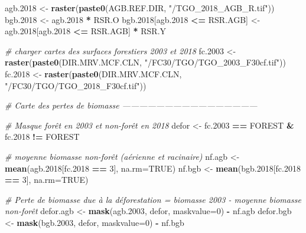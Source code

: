 \documentclass[a4paper, notitlepage, 12pt, krantz2]{krantz}
\newenvironment{Shaded}{\begin{snugshade}}{\end{snugshade}}
\newcommand{\CommentTok}[1]{\textcolor[rgb]{0.56,0.35,0.01}{\textit{#1}}}
\newcommand{\DataTypeTok}[1]{\textcolor[rgb]{0.13,0.29,0.53}{#1}}
\newcommand{\DecValTok}[1]{\textcolor[rgb]{0.00,0.00,0.81}{#1}}
\newcommand{\FloatTok}[1]{\textcolor[rgb]{0.00,0.00,0.81}{#1}}
\newcommand{\KeywordTok}[1]{\textcolor[rgb]{0.13,0.29,0.53}{\textbf{#1}}}
\newcommand{\NormalTok}[1]{#1}
\newcommand{\OperatorTok}[1]{\textcolor[rgb]{0.81,0.36,0.00}{\textbf{#1}}}
\newcommand{\OtherTok}[1]{\textcolor[rgb]{0.56,0.35,0.01}{#1}}
\newcommand{\StringTok}[1]{\textcolor[rgb]{0.31,0.60,0.02}{#1}}
\begin{document}
\begin{Shaded}
\begin{Highlighting}[]
{\NormalTok{agb}\FloatTok{.2018}\NormalTok{ <-}\StringTok{ }\KeywordTok{raster}\NormalTok{(}\KeywordTok{paste0}\NormalTok{(AGB.REF.DIR, }\StringTok{"/TGO_2018_AGB_R.tif"}\NormalTok{))}
\NormalTok{bgb}\FloatTok{.2018}\NormalTok{ <-}\StringTok{ }\NormalTok{agb}\FloatTok{.2018} \OperatorTok{*}\StringTok{ }\NormalTok{RSR.O}
\NormalTok{bgb}\FloatTok{.2018}\NormalTok{[agb}\FloatTok{.2018} \OperatorTok{<=}\StringTok{ }\NormalTok{RSR.AGB] <-}\StringTok{ }\NormalTok{agb}\FloatTok{.2018}\NormalTok{[agb}\FloatTok{.2018} \OperatorTok{<=}\StringTok{ }\NormalTok{RSR.AGB] }\OperatorTok{*}\StringTok{ }\NormalTok{RSR.Y}

\CommentTok{# charger cartes des surfaces forestiers 2003 et 2018}
\NormalTok{fc}\FloatTok{.2003}\NormalTok{ <-}\StringTok{ }\KeywordTok{raster}\NormalTok{(}\KeywordTok{paste0}\NormalTok{(DIR.MRV.MCF.CLN, }\StringTok{"/FC30/TGO/TGO_2003_F30cf.tif"}\NormalTok{))}
\NormalTok{fc}\FloatTok{.2018}\NormalTok{ <-}\StringTok{ }\KeywordTok{raster}\NormalTok{(}\KeywordTok{paste0}\NormalTok{(DIR.MRV.MCF.CLN, }\StringTok{"/FC30/TGO/TGO_2018_F30cf.tif"}\NormalTok{))}


\CommentTok{# Carte des pertes de biomasse ------------------------------------------------}

\CommentTok{# Masque forêt en 2003 et non-forêt en 2018}
\NormalTok{defor <-}\StringTok{ }\NormalTok{fc}\FloatTok{.2003} \OperatorTok{==}\StringTok{ }\NormalTok{FOREST }\OperatorTok{&}\StringTok{ }\NormalTok{fc}\FloatTok{.2018} \OperatorTok{!=}\StringTok{ }\NormalTok{FOREST       }

\CommentTok{# moyenne biomasse non-forêt (aérienne et racinaire)}
\NormalTok{nf.agb <-}\StringTok{ }\KeywordTok{mean}\NormalTok{(agb}\FloatTok{.2018}\NormalTok{[fc}\FloatTok{.2018} \OperatorTok{==}\StringTok{ }\DecValTok{3}\NormalTok{], }\DataTypeTok{na.rm=}\OtherTok{TRUE}\NormalTok{)   }
\NormalTok{nf.bgb <-}\StringTok{ }\KeywordTok{mean}\NormalTok{(bgb}\FloatTok{.2018}\NormalTok{[fc}\FloatTok{.2018} \OperatorTok{==}\StringTok{ }\DecValTok{3}\NormalTok{], }\DataTypeTok{na.rm=}\OtherTok{TRUE}\NormalTok{)}

\CommentTok{# Perte de biomasse due à la déforestation = biomasse 2003 - moyenne biomasse non-forêt}
\NormalTok{defor.agb <-}\StringTok{ }\KeywordTok{mask}\NormalTok{(agb}\FloatTok{.2003}\NormalTok{, defor, }\DataTypeTok{maskvalue=}\DecValTok{0}\NormalTok{) }\OperatorTok{-}\StringTok{ }\NormalTok{nf.agb}
\NormalTok{defor.bgb <-}\StringTok{ }\KeywordTok{mask}\NormalTok{(bgb}\FloatTok{.2003}\NormalTok{, defor, }\DataTypeTok{maskvalue=}\DecValTok{0}\NormalTok{) }\OperatorTok{-}\StringTok{ }\NormalTok{nf.bgb}

}
\end{Highlighting}
\end{Shaded}
\end{document}
